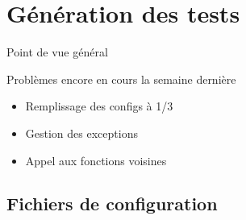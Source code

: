 \documentclass[A4,svgnames,9pt,aspectratio=169]{beamer}
\begin{document}

\section{Génération des tests}
\frame{\sectionpage}

\begin{frame}{Point de vue général}
  
    \begin{block}{Problèmes encore en cours la semaine dernière}
      \begin{itemize}
        \item Remplissage des configs à 1/3
        \item Gestion des exceptions
        \item Appel aux fonctions voisines
      \end{itemize}
    \end{block}
\end{frame}


\subsection{Fichiers de configuration}
\frame{\subsectionpage}
\end{document}
